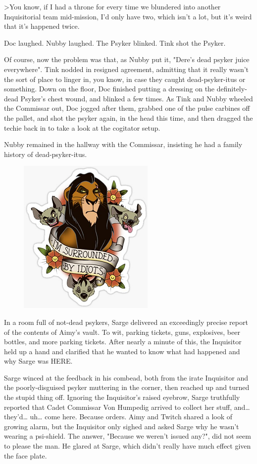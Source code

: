 >You know, if I had a throne for every time we blundered into another Inquisitorial team mid-mission, I'd only have two, which isn't a lot, but it's weird that it's happened twice.

Doc laughed. 
Nubby laughed. 
The Psyker blinked. 
Tink shot the Psyker.

Of course, now the problem was that, as Nubby put it, "Dere's dead psyker juice everywhere". 
Tink nodded in resigned agreement, admitting that it really wasn't the sort of place to linger in, you know, in case they caught dead-psyker-itus or something. 
Down on the floor, Doc finished putting a dressing on the definitely-dead Psyker's chest wound, and blinked a few times. 
As Tink and Nubby wheeled the Commissar out, Doc jogged after them, grabbed one of the pulse carbines off the pallet, and shot the psyker again, in the head this time, and then dragged the techie back in to take a look at the cogitator setup.

Nubby remained in the hallway with the Commissar, insisting he had a family history of dead-psyker-itus.

\begin{figure}
	\begin{center}
		\includegraphics[width=\figwidth]{pics/21/85.png}
	\end{center}
\end{figure}
In a room full of not-dead psykers, Sarge delivered an exceedingly precise report of the contents of Aimy's vault. 
To wit, parking tickets, guns, explosives, beer bottles, and more parking tickets. 
After nearly a minute of this, the Inquisitor held up a hand and clarified that he wanted to know what had happened and why Sarge was HERE.

Sarge winced at the feedback in his combead, both from the irate Inquisitor and the poorly-disguised psyker muttering in the corner, then reached up and turned the stupid thing off. 
Ignoring the Inquisitor's raised eyebrow, Sarge truthfully reported that Cadet Commissar Von Humpedig arrived to collect her stuff, and… they'd… uh… come here. 
Because orders. 
Aimy and Twitch shared a look of growing alarm, but the Inquisitor only sighed and asked Sarge why he wasn't wearing a psi-shield. 
The answer, "Because we weren't issued any?", did not seem to please the man. 
He glared at Sarge, which didn't really have much effect given the face plate. 


